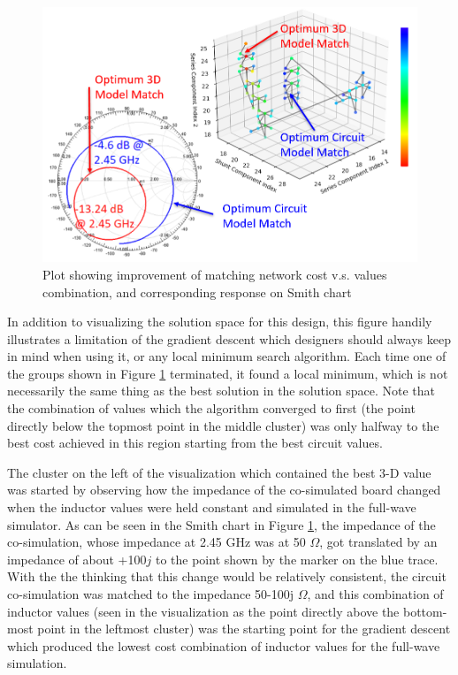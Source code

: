 \documentclass[12pt]{usfcoe}
\begin{document}
    \begin{figure}[H]
		\begin{center}
        	\includegraphics[width=\textwidth]{images/2450_reconfig/gradient_descent.PNG} 
			\caption{Plot showing improvement of matching network cost v.s. values combination, and corresponding response on Smith chart} 
			\label{fig:2450_grad_descent}
		\end{center}
	\end{figure}    
    
    In addition to visualizing the solution space for this design, this figure handily illustrates a limitation of the gradient descent which designers should always keep in mind when using it, or any local minimum search algorithm.
    Each time one of the groups shown in Figure \ref{fig:2450_grad_descent} terminated, it found a local minimum, which is not necessarily the same thing as the best solution in the solution space.
    Note that the combination of values which the algorithm converged to first (the point directly below the topmost point in the middle cluster) was only halfway to the best cost achieved in this region starting from the best circuit values.
    
    The cluster on the left of the visualization which contained the best 3-D value was started by observing how the impedance of the co-simulated board changed when the inductor values were held constant and simulated in the full-wave simulator.
    As can be seen in the Smith chart in Figure \ref{fig:2450_grad_descent}, the impedance of the co-simulation, whose impedance at 2.45 GHz was at 50 $\Omega$, got translated by an impedance of about +100$j$ to the point shown by the marker on the blue trace. 
    With the the thinking that this change would be relatively consistent, the circuit co-simulation was matched to the impedance 50-100j $\Omega$, and this combination of inductor values (seen in the visualization as the point directly above the bottom-most point in the leftmost cluster) was the starting point for the gradient descent which produced the lowest cost combination of inductor values for the full-wave simulation.
    
\end{document}
